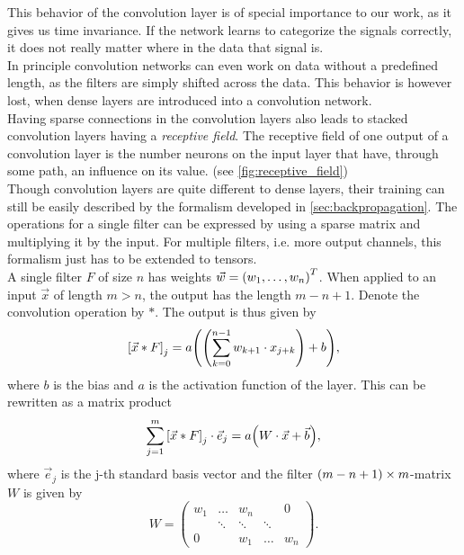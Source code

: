This behavior of the convolution layer is of special importance to our work, as it gives us time invariance. If the network learns to categorize the signals correctly, it does not really matter where in the data that signal is.\\
In principle convolution networks can even work on data without a predefined length, as the filters are simply shifted across the data. This behavior is however lost, when dense layers are introduced into a convolution network.\medskip\\
Having sparse connections in the convolution layers also leads to stacked convolution layers having a \emph{receptive field}. The receptive field of one output of a convolution layer is the number neurons on the input layer that have, through some path, an influence on its value. (see \autoref{fig:receptive_field})\medskip\\
Though convolution layers are quite different to dense layers, their training can still be easily described by the formalism developed in \autoref{sec:backpropagation}. The operations for a single filter can be expressed by using a sparse matrix and multiplying it by the input. For multiple filters, i.e. more output channels, this formalism just has to be extended to tensors.\\
A single filter $F$ of size $n$ has weights $\vec{w} = {\left( w_1, \dotsc, w_n \right)}^T$. When applied to an input $\vec{x}$ of length $m>n$, the output has the length $m - n + 1$. Denote the convolution operation by $\ast$. The output is thus given by
\begin{equation}
{\left[\vec{x}\ast F\right]}_j = a{\left( {\left( \sum_{k=0}^{n-1} w_{k+1}\cdot x_{j+k} \right)}+b \right)},
\end{equation}
where $b$ is the bias and $a$ is the activation function of the layer. This can be rewritten as a matrix product
\begin{equation}
\sum_{j=1}^m {\left[\vec{x}\ast F\right]}_j \cdot\vec{e}_j = a{\left( W\cdot \vec{x}+\vec{b} \right)},
\end{equation}
where $\vec{e}_j$ is the j-th standard basis vector and the filter ${\left( m-n+1 \right)}\times m$-matrix $W$ is given by
\begin{equation}
W =
\begin{pmatrix}
	w_1 & \dots & w_n & {} & 0 \\
	{} & \ddots & \ddots & \ddots & {}\\
	0 & {} & w_1 & \dots & w_n
\end{pmatrix}.
\end{equation}
